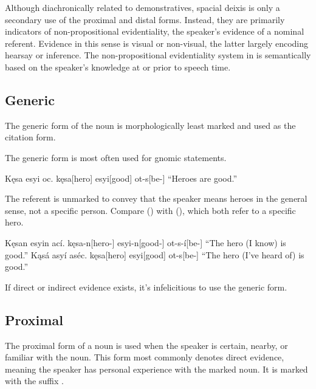 Although diachronically related to demonstratives, spacial deixis is only a secondary use of the proximal and distal forms. Instead, they are primarily indicators of non-propositional evidentiality,  the speaker's evidence of a nominal referent. Evidence in this sense is visual or non-visual, the latter largely encoding hearsay or inference. The non-propositional evidentiality system in \langname{} is semantically based on the speaker's knowledge at or prior to speech time. 

\subsection{Generic}
The generic form of the noun is morphologically least marked and used as the citation form.

The generic form is most often used for gnomic statements.

\begin{gloss}
    \begingl
        \glpreamble Kęsa esyi oc. \endpreamble
            kęsa[hero]
            esyi[good]
            ot-s[be-]
        \glft “Heroes are good.”
    \endgl
\end{gloss}

The referent  is unmarked to convey that the speaker means heroes in the general sense, not a specific person. Compare (\lastx) with (\nextx), which both refer to a specific hero.

\begin{gloss}
    \a \begingl
        \glpreamble Kęsan esyin ací. \endpreamble
            kęsa-n[hero-]
            esyi-n[good-]
            ot-s-í[be-]
        \glft “The hero (I know) is good.”
    \endgl
    \a \begingl
            \glpreamble Kąsá asyí aséc. \endpreamble
                kęsa[hero\tbs{}]
                esyi[good\tbs{}]
                ot-s[be-\tbs{}]
            \glft “The hero (I've heard of) is good.”
    \endgl
\end{gloss}

If direct or indirect evidence exists, it's infelicitious to use the generic form.

\subsection{Proximal}
The proximal form of a noun is used when the speaker is certain, nearby, or familiar with the noun.
This form most commonly denotes direct evidence, meaning the speaker has personal experience with the marked noun. It is marked with the suffix . 

